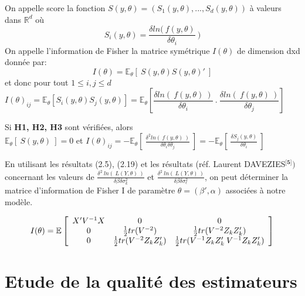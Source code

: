 \documentclass[11pt,fleqn]{book} %
\begin{document}
	\begin{definition}
		On appelle score la fonction $S(y,\theta)=\left( S_1(y,\theta), ..., S_d(y,\theta) \right)$ à valeurs dans $\mathbb{R}^d$ où
		\[
		S_i(y,\theta)=\frac{\delta ln(\:f(y,\theta)}{\delta \theta_i} \:)
		\]
		On appelle l'information de Fisher la matrice symétrique $I(\theta)$ de dimension d\:x\:d donnée par: 
		\[
		I(\theta)=\mathbb{E}_\theta\left[\: S(y,\theta) S(y,\theta)'  \:\right]
		\]
		et donc pour tout $ 1 \leq i,j \leq d$
		\[
		I(\theta)_{ij}=\mathbb{E}_\theta\left[ S_i(y,\theta) S_j(y,\theta)\right]=\mathbb{E}_\theta\left[  \frac{\delta ln(\:f(y,\theta)\:)}{\delta \theta_i} \:.\:  \frac{\delta ln(\:f(y,\theta)\:)}{\delta \theta_j} \right] \qquad 
		\] 
	\end{definition}
	
	\vspace{2em}
	
	\begin{theorem} Si \textbf{H1, H2, H3} sont vérifiées, alors \\
		
		$\mathbb{E}_\theta\left[\:S(y,\theta) \:\right]=0 $ \:et\: $ I(\theta)_{ij}=-\mathbb{E}_\theta\left[\: \frac{\delta^2 ln(\:f(y,\theta)\:)}{\delta \theta_i \delta\theta_j} \:\right]=-\mathbb{E}_\theta\left[\:\frac{\delta  S_j(y,\theta)}{\delta\theta_i}\:\right]$
	\end{theorem}
	
	\vspace{4em}
	
	En utilisant les résultats (2.5), (2.19) et les résultats (réf. Laurent DAVEZIES$^\textbf{[5]})$ concernant les valeurs de $\frac{\delta^2\: ln( \:\textit{L}(Y,\theta)\:)}{\delta \beta \delta \sigma_k^2 }$ et $\frac{\delta^2\: ln( \:\textit{L}(Y,\theta)\:)}{\delta \beta \delta \sigma_{\epsilon}^2 }$, on peut déterminer la matrice d'information de Fisher I de paramètre $\theta=(\beta',\alpha)$  associées à notre modèle.
	
	\[
	I(\theta)=\mathbb{E}\left[
	\begin{array}{ c c c}
		X'V^{-1}X & 0 & 0  \\
		0 & \frac{1}{2}tr(V^{-2}) & \frac{1}{2}tr(V^{-2} Z_k Z_k') \\
		0 & \frac{1}{2}tr(V^{-2} Z_k Z_k') & \frac{1}{2}tr(V^{-1} Z_k Z_k'\:V^{-1} Z_k Z_k')
	\end{array} \right]
	\]
	
	
	\newpage
	
	\section{Etude de la qualité des estimateurs}
	
\end{document}

